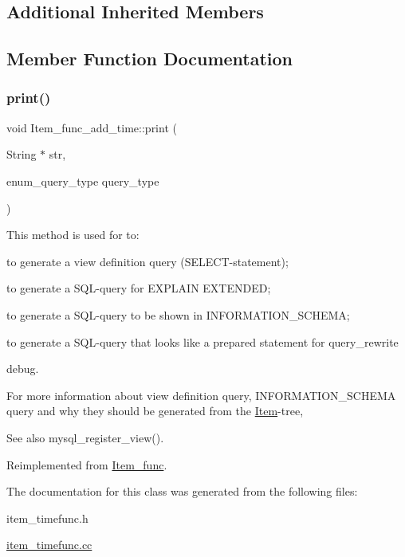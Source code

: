 \subsection*{Additional Inherited Members}


\subsection{Member Function Documentation}
\mbox{\label{classItem__func__add__time_a29dd981b554a30df77ea0c3a24fd308c}} 
\subsubsection{\texorpdfstring{print()}{print()}}
{\footnotesize\ttfamily void Item\+\_\+func\+\_\+add\+\_\+time\+::print (\begin{DoxyParamCaption}\item[{String $\ast$}]{str,  }\item[{enum\+\_\+query\+\_\+type}]{query\+\_\+type }\end{DoxyParamCaption})\hspace{0.3cm}{\ttfamily [virtual]}}

This method is used for to\+:
\begin{DoxyItemize}
\item to generate a view definition query (S\+E\+L\+E\+CT-\/statement);
\item to generate a S\+QL-\/query for E\+X\+P\+L\+A\+IN E\+X\+T\+E\+N\+D\+ED;
\item to generate a S\+QL-\/query to be shown in I\+N\+F\+O\+R\+M\+A\+T\+I\+O\+N\+\_\+\+S\+C\+H\+E\+MA;
\item to generate a S\+QL-\/query that looks like a prepared statement for query\+\_\+rewrite
\item debug.
\end{DoxyItemize}

For more information about view definition query, I\+N\+F\+O\+R\+M\+A\+T\+I\+O\+N\+\_\+\+S\+C\+H\+E\+MA query and why they should be generated from the \mbox{\hyperlink{classItem}{Item}}-\/tree, \begin{DoxySeeAlso}{See also}
mysql\+\_\+register\+\_\+view(). 
\end{DoxySeeAlso}


Reimplemented from \mbox{\hyperlink{classItem__func_afb302ee25d4721ace27d3f5053d4ee41}{Item\+\_\+func}}.



The documentation for this class was generated from the following files\+:\begin{DoxyCompactItemize}
\item 
item\+\_\+timefunc.\+h\item 
\mbox{\hyperlink{item__timefunc_8cc}{item\+\_\+timefunc.\+cc}}\end{DoxyCompactItemize}
